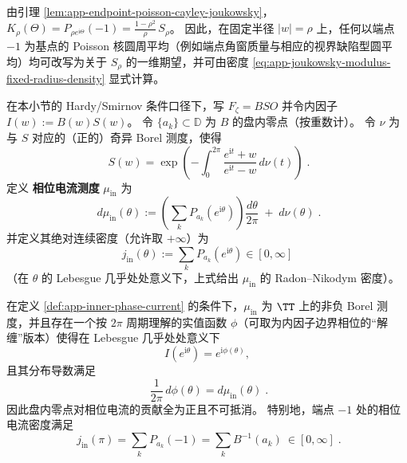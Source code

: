 \begin{remark}[与端点角窗圆平均的互译]\label{rem:app-joukowsky-modulus-window-translation}
由引理 \ref{lem:app-endpoint-poisson-cayley-joukowsky}，
\(
K_\rho(\Theta)=P_{\rho e^{\mathrm{i}\Theta}}(-1)=\frac{1-\rho^2}{\rho}\,S_\rho
\)。
因此，在固定半径 \(|w|=\rho\) 上，任何以端点 \(-1\) 为基点的 Poisson 核圆周平均（例如端点角窗质量与相应的视界缺陷型圆平均）均可改写为关于 \(S_\rho\) 的一维期望，并可由密度 \eqref{eq:app-joukowsky-modulus-fixed-radius-density} 显式计算。
\end{remark}

\begin{definition}[内因子相位电流测度]\label{def:app-inner-phase-current}
在本小节的 Hardy/Smirnov 条件口径下，写 \(F_{\zeta}=BSO\) 并令内因子 \(I(w):=B(w)S(w)\)。
令 \(\{a_k\}\subset\mathbb{D}\) 为 \(B\) 的盘内零点（按重数计）。
令 \(\nu\) 为与 \(S\) 对应的（正的）奇异 Borel 测度，使得
\begin{equation}\label{eq:app-singular-inner-factor-measure}
\boxed{\;
S(w)
=\exp\!\left(
-\int_{0}^{2\pi}\frac{e^{\mathrm{i}t}+w}{e^{\mathrm{i}t}-w}\,d\nu(t)
\right)\; }.
\end{equation}
定义 \textbf{相位电流测度} \(\mu_{\mathrm{in}}\) 为
\begin{equation}\label{eq:app-inner-phase-current-measure}
\boxed{\;
d\mu_{\mathrm{in}}(\theta)
:=
\left(\sum_k P_{a_k}(e^{\mathrm{i}\theta})\right)\frac{d\theta}{2\pi}
\;+\;
d\nu(\theta)\; }.
\end{equation}
并定义其绝对连续密度（允许取 \(+\infty\)）为
\begin{equation}\label{eq:app-inner-phase-current-density}
\boxed{\;
j_{\mathrm{in}}(\theta):=\sum_k P_{a_k}(e^{\mathrm{i}\theta})\in[0,\infty]\;}
\end{equation}
（在 \(\theta\) 的 Lebesgue 几乎处处意义下，上式给出 \(\mu_{\mathrm{in}}\) 的 Radon--Nikodym 密度）。
\end{definition}

\begin{theorem}\label{thm:app-inner-phase-current-poisson}
在定义 \ref{def:app-inner-phase-current} 的条件下，\(\mu_{\mathrm{in}}\) 为 \(\TT\) 上的非负 Borel 测度，并且存在一个按 \(2\pi\) 周期理解的实值函数 \(\phi\)（可取为内因子边界相位的“解缠”版本）使得在 Lebesgue 几乎处处意义下
\[
I(e^{\mathrm{i}\theta})=e^{\mathrm{i}\phi(\theta)},
\]
且其分布导数满足
\begin{equation}\label{eq:app-inner-phase-current-as-arg-derivative}
\boxed{\;
\frac{1}{2\pi}\,d\phi(\theta)=d\mu_{\mathrm{in}}(\theta)\; }.
\end{equation}
因此盘内零点对相位电流的贡献全为正且不可抵消。
特别地，端点 \(-1\) 处的相位电流密度满足
\begin{equation}\label{eq:app-endpoint-phase-current-lowerbound}
\boxed{\;
j_{\mathrm{in}}(\pi)
=\sum_k P_{a_k}(-1)
=\sum_k B^{-1}(a_k)\ \in[0,\infty]\; }.
\end{equation}
\end{theorem}

